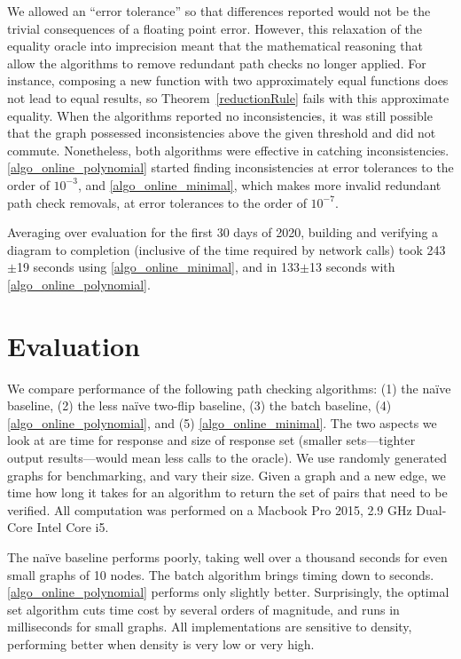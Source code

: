 \documentclass[sigplan,review,anonymous]{acmart}
\begin{document}
{We allowed an ``error tolerance'' so that differences reported would not be the trivial consequences of a floating point error.
However, this relaxation of the equality oracle into imprecision meant that the mathematical reasoning that allow the algorithms to remove redundant path checks no longer applied.
For instance, composing a new function with two approximately equal functions does not lead to equal results, so Theorem~\ref{reductionRule} fails with this approximate equality.
When the algorithms reported no inconsistencies, it was still possible that the graph possessed inconsistencies above the given threshold and did not commute.
Nonetheless, both algorithms were effective in catching inconsistencies. \ref{algo_online_polynomial} started finding inconsistencies at error tolerances to the order of $10^{-3}$, and \ref{algo_online_minimal}, which makes more invalid redundant path check removals, at error tolerances to the order of $10^{-7}$.

Averaging over evaluation for the first 30 days of 2020, building and verifying a diagram to completion (inclusive of the time required by network calls) took 243$\pm$19 seconds using \ref{algo_online_minimal}, and in 133$\pm$13 seconds with \ref{algo_online_polynomial}.

\section{Evaluation}
\label{sec:evaluation}
We compare performance of the following path checking algorithms:
(1) the na\"{i}ve baseline,
(2) the less na\"{i}ve two-flip baseline,
(3) the batch baseline,
(4) \ref{algo_online_polynomial}, and
(5) \ref{algo_online_minimal}.
The two aspects we look at are time for response and size of response set (smaller sets---tighter output results---would mean less calls to the oracle).
We use randomly generated graphs for benchmarking, and vary their size.
Given a graph and a new edge, we time how long it takes for an algorithm to return  the set of pairs that need to be verified.
All computation was performed on a Macbook Pro 2015, 2.9 GHz Dual-Core Intel Core i5.

The na\"{i}ve baseline performs poorly, taking well over a thousand seconds for even small graphs of 10 nodes.
The batch algorithm brings timing down to seconds.
\ref{algo_online_polynomial} performs only slightly better.
Surprisingly, the optimal set algorithm cuts time cost by several orders of magnitude, and runs in milliseconds for small graphs.
All implementations are sensitive to density, performing better when density is very low or very high.

}
\end{document}
